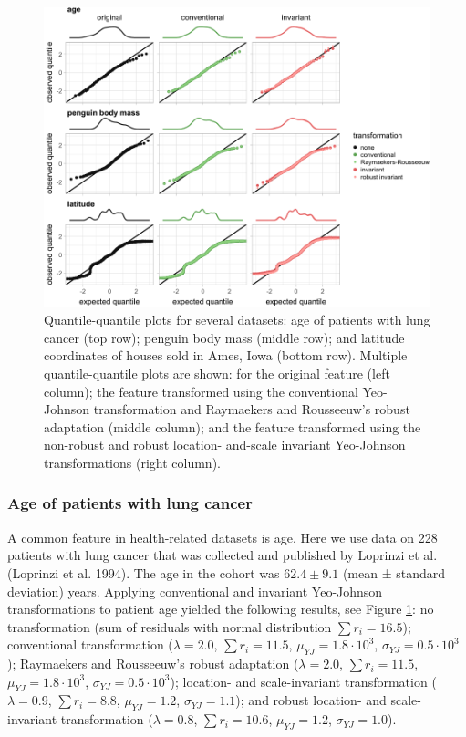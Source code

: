 \documentclass[preprint,12pt,authoryear]{elsarticle}
\begin{document}
\begin{figure}

{\centering \includegraphics{figure_8} 

}

\caption{Quantile-quantile plots for several datasets: age of patients with lung cancer (top row); penguin body mass (middle row); and latitude coordinates of houses sold in Ames, Iowa (bottom row). Multiple quantile-quantile plots are shown: for the original feature (left column); the feature transformed using the conventional Yeo-Johnson transformation and Raymaekers and Rousseeuw's robust adaptation (middle column); and the feature transformed using the non-robust and robust location- and-scale invariant Yeo-Johnson transformations (right column).}\label{fig:experimental-results-invariance}
\end{figure}

\subsubsection{Age of patients with lung
cancer}\label{age-of-patients-with-lung-cancer}

A common feature in health-related datasets is age. Here we use data on
228 patients with lung cancer that was collected and published by
Loprinzi et al. (Loprinzi et al. 1994). The age in the cohort was
\(62.4 \pm 9.1\) (mean ± standard deviation) years. Applying
conventional and invariant Yeo-Johnson transformations to patient age
yielded the following results, see Figure
\ref{fig:experimental-results-invariance}: no transformation (sum of
residuals with normal distribution \(\sum r_i = 16.5\)); conventional
transformation (\(\lambda = 2.0\), \(\sum r_i = 11.5\),
\(\mu_{YJ} = 1.8 \cdot 10^3\), \(\sigma_{YJ} = 0.5 \cdot 10^3\));
Raymaekers and Rousseeuw's robust adaptation (\(\lambda = 2.0\),
\(\sum r_i = 11.5\), \(\mu_{YJ} = 1.8 \cdot 10^3\),
\(\sigma_{YJ} = 0.5 \cdot 10^3\)); location- and scale-invariant
transformation (\(\lambda = 0.9\), \(\sum r_i = 8.8\),
\(\mu_{YJ} = 1.2\), \(\sigma_{YJ} = 1.1\)); and robust location- and
scale-invariant transformation (\(\lambda = 0.8\), \(\sum r_i = 10.6\),
\(\mu_{YJ} = 1.2\), \(\sigma_{YJ} = 1.0\)).
\end{document}
